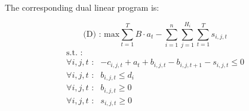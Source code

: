 The corresponding dual linear program is:

\[
\textrm{(D) : max}   \sum^{T}_{t=1}B \cdot a_t - \sum^{n}_{i=1}\sum^{H_i}_{j=1}\sum^{T}_{t=1}s_{i,j,t}
\]
\[
	\begin{array}{rc}
	\textrm{s.t. :} & \\
		\forall i,j,t \textrm{ :}	    & -c_{i,j,t} + a_t + b_{i,j,t} - b_{i,j,t+1} - s_{i,j,t} \leq 0 \\
		\forall i,j,t \textrm{ :}	    & b_{i,j,t} \leq d_i \\
		\forall i,j,t \textrm{ :}	    & b_{i,j,t} \geq 0 \\
		\forall i,j,t \textrm{ :}	    & s_{i,j,t} \geq 0
	\end{array}
\]






